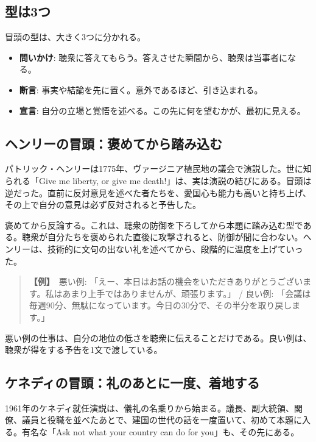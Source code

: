 \documentclass{article}
\begin{document}
\subsection{型は3つ}

冒頭の型は、大きく3つに分かれる。

\begin{itemize}
\item \textbf{問いかけ}: 聴衆に答えてもらう。答えさせた瞬間から、聴衆は当事者になる。
\item \textbf{断言}: 事実や結論を先に置く。意外であるほど、引き込まれる。
\item \textbf{宣言}: 自分の立場と覚悟を述べる。この先に何を望むかが、最初に見える。
\end{itemize}

\subsection{ヘンリーの冒頭：褒めてから踏み込む}

パトリック・ヘンリーは1775年、ヴァージニア植民地の議会で演説した。世に知られる「Give me liberty, or give me death!」は、実は演説の結びにある。冒頭は逆だった。直前に反対意見を述べた者たちを、愛国心も能力も高いと持ち上げ、その上で自分の意見は必ず反対されると予告した。

褒めてから反論する。これは、聴衆の防御を下ろしてから本題に踏み込む型である。聴衆が自分たちを褒められた直後に攻撃されると、防御が間に合わない。ヘンリーは、技術的に文句の出ない礼を述べてから、段階的に温度を上げていった。

\begin{quote}
\textbf{【例】}\ 悪い例: 「えー、本日はお話の機会をいただきありがとうございます。私はあまり上手ではありませんが、頑張ります。」 / 良い例: 「会議は毎週90分、無駄になっています。今日の30分で、その半分を取り戻します。」
\end{quote}

悪い例の仕事は、自分の地位の低さを聴衆に伝えることだけである。良い例は、聴衆が得をする予告を1文で渡している。

\subsection{ケネディの冒頭：礼のあとに一度、着地する}

1961年のケネディ就任演説は、儀礼の名乗りから始まる。議長、副大統領、閣僚、議員と役職を並べたあとで、建国の世代の話を一度置いて、初めて本題に入る。有名な「Ask not what your country can do for you」も、その先にある。
\end{document}
